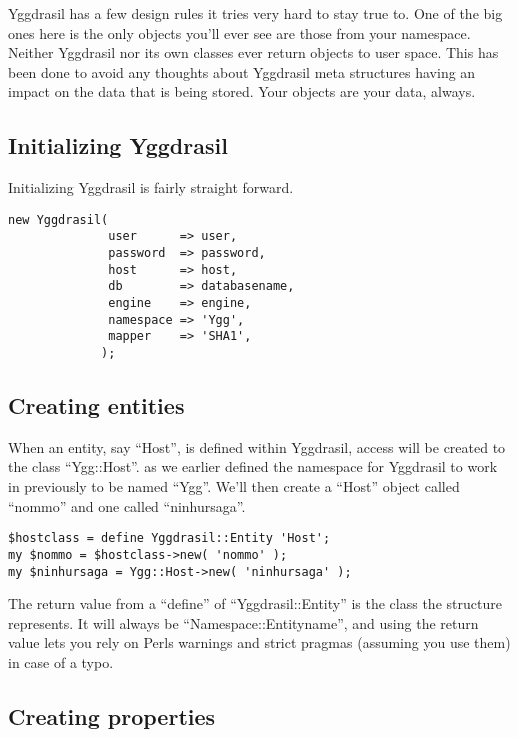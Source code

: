 \documentclass[english,a4paper]{article}
\begin{document}
Yggdrasil has a few design rules it tries very hard to stay true to.
One of the big ones here is the only objects you'll ever see are those
from your namespace.  Neither Yggdrasil nor its own classes ever
return objects to user space.  This has been done to avoid any
thoughts about Yggdrasil meta structures having an impact on the data
that is being stored.  Your objects are your data, always.

\subsection{Initializing Yggdrasil}

Initializing Yggdrasil is fairly straight forward.

\lstset{caption=Initializing Yggrasil,label=ygginit,float=tp,aboveskip=0.7cm}
\begin{lstlisting}
new Yggdrasil(
              user      => user,
              password  => password,
              host      => host,
              db        => databasename,
              engine    => engine,
              namespace => 'Ygg',
              mapper    => 'SHA1',
             );
\end{lstlisting}

\subsection{Creating entities}

When an entity, say ``Host'', is defined within Yggdrasil, access will
be created to the class ``Ygg::Host''.  as we earlier defined the
namespace for Yggdrasil to work in previously to be named ``Ygg''.
We'll then create a ``Host'' object called ``nommo'' and one called
``ninhursaga''.

\lstset{caption=Defining entities,label=entity}
\begin{lstlisting}
$hostclass = define Yggdrasil::Entity 'Host';
my $nommo = $hostclass->new( 'nommo' );
my $ninhursaga = Ygg::Host->new( 'ninhursaga' );
\end{lstlisting}

The return value from a ``define'' of ``Yggdrasil::Entity'' is the
class the structure represents.  It will always be
``Namespace::Entityname'', and using the return value lets you rely on
Perls warnings and strict pragmas (assuming you use them) in case of a
typo.

\subsection{Creating properties}
\end{document}
